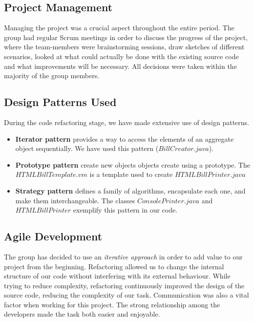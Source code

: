 \documentclass[11pt,twocolumn]{article} %
\begin{document}
\subsection{Project Management}
Managing the project was a crucial aspect throughout the entire period. The group had regular Scrum meetings in order to discuss the 
progress of the project, where the team-members were brainstorming sessions, draw sketches of different scenarios, looked at
what could actually be done with the existing source code and what improvements will be necessary. All decisions were taken
within the majority of the group members.

\subsection{Design Patterns Used}
During the code refactoring stage, we have made extensive use of design patterns.
\begin{itemize}
\item{{\bf Iterator pattern} provides a way to access the elements of an aggregate object sequentially. We have used this pattern ($BillCreator.java$).}
\item{{\bf Prototype pattern}  create new objects objects create using a prototype. The $HTMLBillTemplate.vm$ is a template used to create $HTMLBillPrinter.java$}
\item{{\bf Strategy pattern} defines a family of algorithms, encapsulate each one, and make them interchangeable. The classes $ConsolePrinter.java$ and $HTMLBillPrinter$ exemplify this pattern in our code.}
\end{itemize}


\subsection{Agile Development}
The group has decided to use an \emph{iterative approach} in order to add value to our project from the beginning. 
Refactoring allowed us to change the internal structure of our code without interfering with its external behaviour. While trying to reduce complexity, refactoring continuously improved the design of the source code, reducing the complexity of our task.
Communication was also a vital factor when working for this project. The strong relationship among the developers made the task both 
easier and enjoyable.
\end{document}
